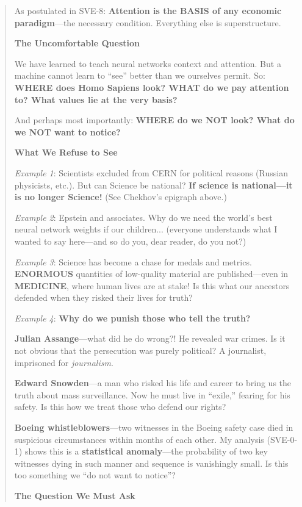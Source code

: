 \documentclass[11pt,a4paper]{article}
\theoremstyle{definition}
\theoremstyle{remark}
\begin{document}
\begin{abstract}
As postulated in SVE-8: \textbf{Attention is the BASIS of any economic paradigm}---the necessary condition. Everything else is superstructure.

\medskip
\noindent\textbf{The Uncomfortable Question}

We have learned to teach neural networks context and attention. But a machine cannot learn to ``see'' better than we ourselves permit. So: \textbf{WHERE does Homo Sapiens look? WHAT do we pay attention to? What values lie at the very basis?}

And perhaps most importantly: \textbf{WHERE do we NOT look? What do we NOT want to notice?}

\medskip
\noindent\textbf{What We Refuse to See}

\textit{Example 1}: Scientists excluded from CERN for political reasons (Russian physicists, etc.). But can Science be national? \textbf{If science is national---it is no longer Science!} (See Chekhov's epigraph above.)

\textit{Example 2}: Epstein and associates. Why do we need the world's best neural network weights if our children... (everyone understands what I wanted to say here---and so do you, dear reader, do you not?)

\textit{Example 3}: Science has become a chase for medals and metrics. \textbf{ENORMOUS} quantities of low-quality material are published---even in \textbf{MEDICINE}, where human lives are at stake! Is this what our ancestors defended when they risked their lives for truth?

\textit{Example 4}: \textbf{Why do we punish those who tell the truth?}

\textbf{Julian Assange}---what did he do wrong?! He revealed war crimes. Is it not obvious that the persecution was purely political? A journalist, imprisoned for \textit{journalism}.

\textbf{Edward Snowden}---a man who risked his life and career to bring us the truth about mass surveillance. Now he must live in ``exile,'' fearing for his safety. Is this how we treat those who defend our rights?

\textbf{Boeing whistleblowers}---two witnesses in the Boeing safety case died in suspicious circumstances within months of each other. My analysis (SVE-0-1) shows this is a \textbf{statistical anomaly}---the probability of two key witnesses dying in such manner and sequence is vanishingly small. Is this too something we ``do not want to notice''?

\medskip
\noindent\textbf{The Question We Must Ask}


\end{abstract}
\end{document}
